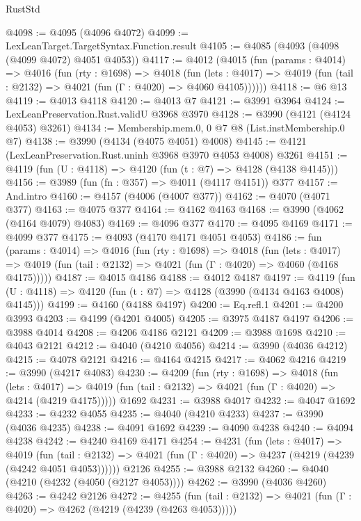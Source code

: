 \begin{lexlean}{RustStd}
\begin{coremodule}
@4098 := @4095 (@4096 @4072)
@4099 := LexLeanTarget.TargetSyntax.Function.result
@4105 := @4085 (@4093 (@4098 (@4099 @4072) @4051 @4053))
@4117 := @4012
    (@4015
      (fun (params : @4014) =>
      @4016
        (fun (rty : @1698) =>
        @4018
          (fun (lets : @4017) =>
          @4019 (fun (tail : @2132) => @4021 (fun (Γ : @4020) => @4060 @4105))))))
@4118 := @6 @13
@4119 := @4013 @4118
@4120 := @4013 @7
@4121 := @3991 @3964
@4124 := LexLeanPreservation.Rust.validU @3968 @3970
@4128 := @3990 (@4121 (@4124 @4053) @3261)
@4134 := Membership.mem.{0, 0} @7 @8 (List.instMembership.{0} @7)
@4138 := @3990 (@4134 (@4075 @4051) @4008)
@4145 := @4121 (LexLeanPreservation.Rust.uninh @3968 @3970 @4053 @4008) @3261
@4151 := @4119 (fun (U : @4118) => @4120 (fun (t : @7) => @4128 (@4138 @4145)))
@4156 := @3989 (fun (fn : @357) => @4011 (@4117 @4151)) @377
@4157 := And.intro
@4160 := @4157 (@4006 (@4007 @377))
@4162 := @4070 (@4071 @377)
@4163 := @4075 @377
@4164 := @4162 @4163
@4168 := @3990 (@4062 (@4164 @4079) @4083)
@4169 := @4096 @377
@4170 := @4095 @4169
@4171 := @4099 @377
@4175 := @4093 (@4170 @4171 @4051 @4053)
@4186 := fun (params : @4014) =>
  @4016
    (fun (rty : @1698) =>
    @4018
      (fun (lets : @4017) =>
      @4019 (fun (tail : @2132) => @4021 (fun (Γ : @4020) => @4060 (@4168 @4175)))))
@4187 := @4015 @4186
@4188 := @4012 @4187
@4197 := @4119 (fun (U : @4118) => @4120 (fun (t : @7) => @4128 (@3990 (@4134 @4163 @4008) @4145)))
@4199 := @4160 (@4188 @4197)
@4200 := Eq.refl.{1}
@4201 := @4200 @3993
@4203 := @4199 (@4201 @4005)
@4205 := @3975 @4187 @4197
@4206 := @3988 @4014
@4208 := @4206 @4186 @2121
@4209 := @3988 @1698
@4210 := @4043 @2121
@4212 := @4040 (@4210 @4056)
@4214 := @3990 (@4036 @4212)
@4215 := @4078 @2121
@4216 := @4164 @4215
@4217 := @4062 @4216
@4219 := @3990 (@4217 @4083)
@4230 := @4209
    (fun (rty : @1698) =>
    @4018
      (fun (lets : @4017) =>
      @4019 (fun (tail : @2132) => @4021 (fun (Γ : @4020) => @4214 (@4219 @4175)))))
    @1692
@4231 := @3988 @4017
@4232 := @4047 @1692
@4233 := @4232 @4055
@4235 := @4040 (@4210 @4233)
@4237 := @3990 (@4036 @4235)
@4238 := @4091 @1692
@4239 := @4090 @4238
@4240 := @4094 @4238
@4242 := @4240 @4169 @4171
@4254 := @4231
    (fun (lets : @4017) =>
    @4019
      (fun (tail : @2132) => @4021 (fun (Γ : @4020) => @4237 (@4219 (@4239 (@4242 @4051 @4053))))))
    @2126
@4255 := @3988 @2132
@4260 := @4040 (@4210 (@4232 (@4050 (@2127 @4053))))
@4262 := @3990 (@4036 @4260)
@4263 := @4242 @2126
@4272 := @4255
    (fun (tail : @2132) => @4021 (fun (Γ : @4020) => @4262 (@4219 (@4239 (@4263 @4053)))))

\end{coremodule}
\end{lexlean}
